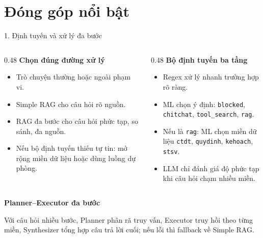 \documentclass[t, aspectratio=169]{beamer}
\begin{document}
	\section{Đóng góp nổi bật}

				\begin{frame}{1. Định tuyến và xử lý đa bước}
					\begin{columns}[T,onlytextwidth]
						\begin{column}{0.48\textwidth}
							{\bfseries\color{hustprimary} Chọn đúng đường xử lý}
							\vspace{0.08cm}

							\small
							\begin{itemize}
								\setlength{\itemsep}{0.12cm}
								\item Trò chuyện thường hoặc ngoài phạm vi.
								\item Simple RAG cho câu hỏi rõ nguồn.
								\item RAG đa bước cho câu hỏi phức tạp, so sánh, đa nguồn.
								\item Nếu bộ định tuyến thiếu tự tin: mở rộng miền dữ liệu hoặc dùng luồng dự phòng.
							\end{itemize}
						\end{column}
						\begin{column}{0.48\textwidth}
							{\bfseries\color{hustprimary} Bộ định tuyến ba tầng}
							\vspace{0.08cm}

							\small
							\begin{itemize}
								\setlength{\itemsep}{0.12cm}
								\item Regex xử lý nhanh trường hợp rõ ràng.
								\item ML chọn ý định: \texttt{blocked}, \texttt{chitchat}, \texttt{tool\_search}, \texttt{rag}.
								\item Nếu là \texttt{rag}: ML chọn miền dữ liệu \texttt{ctdt}, \texttt{quydinh}, \texttt{kehoach}, \texttt{stsv}.
								\item LLM chỉ đánh giá độ phức tạp khi câu hỏi chạm nhiều miền.
							\end{itemize}
						\end{column}
					\end{columns}

					\vspace{0.22cm}
					{\bfseries\color{hustprimary} Planner--Executor đa bước}

					\vspace{0.02cm}
					\small Với câu hỏi nhiều bước, Planner phân rã truy vấn, Executor truy hồi theo từng miền, Synthesizer tổng hợp câu trả lời cuối; nếu lỗi thì fallback về Simple RAG.
				\end{frame}
\end{document}
